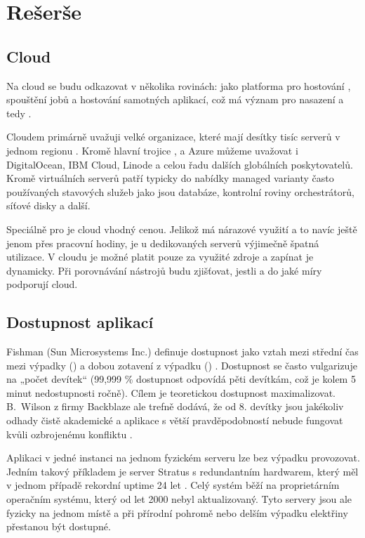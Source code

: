 \chapter{Rešerše}
    \blind[1]
    \blind[1]
    \blind[1]

    \section{Cloud}
        Na cloud se budu odkazovat v několika rovinách: jako platforma pro hostování \CI, spouštění jobů a hostování samotných aplikací, což má význam pro nasazení a tedy \CD.

        Cloudem primárně uvažuji velké organizace, které mají desítky tisíc serverů v jednom regionu \cite{pier-cloud}. Kromě hlavní trojice ,  a Azure můžeme uvažovat i DigitalOcean, IBM Cloud, Linode a celou řadu dalších globálních poskytovatelů. Kromě virtuálních serverů patří typicky do nabídky managed varianty často používaných stavových služeb jako jsou databáze, kontrolní roviny orchestrátorů, síťové disky a další.

        Speciálně pro \CI je cloud vhodný cenou. Jelikož \CI má nárazové využití a to navíc ještě jenom přes pracovní hodiny, je u dedikovaných serverů výjimečně špatná utilizace. V cloudu je možné platit pouze za využité zdroje a zapínat je dynamicky. Při porovnávání \CI nástrojů budu zjišťovat, jestli a do jaké míry podporují cloud.

    \section{Dostupnost aplikací}
        Fishman (Sun Microsystems Inc.) definuje dostupnost jako vztah mezi střední čas mezi výpadky () a dobou zotavení z výpadku () \cite{fishman-availability}. Dostupnost se často vulgarizuje na „počet devítek“ (99,999 \% dostupnost odpovídá pěti devítkám, což je kolem 5 minut nedostupnosti ročně). Cílem je teoretickou dostupnost maximalizovat. B.~Wilson z firmy Backblaze ale trefně dodává, že od 8. devítky jsou jakékoliv odhady čistě akademické a aplikace s větší pravděpodobností nebude fungovat kvůli ozbrojenému konfliktu \cite{backblaze-availability}.

        Aplikaci v jedné instanci na jednom fyzickém serveru lze bez výpadku provozovat. Jedním takový příkladem je server Stratus s redundantním hardwarem, který měl v jednom případě rekordní uptime 24 let \cite{thibodeau-longest-uptime}. Celý systém běží na proprietárním operačním systému, který od let 2000 nebyl aktualizovaný. Tyto servery jsou ale fyzicky na jednom místě a při přírodní pohromě nebo delším výpadku elektřiny přestanou být dostupné.

